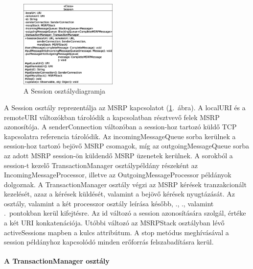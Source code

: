 \begin{figure}
  \vspace{-15pt}
  \begin{center}
    \includegraphics[width=0.43\textwidth]{img/class_diagrams/Session.eps}
  \end{center}
  \vspace{-15pt}
  \captionsetup{font=scriptsize}
  \caption{A Session osztálydiagramja}
   \label{fig:class_session}
  \vspace{-10pt}
\end{figure}
A Session osztály reprezentálja az MSRP kapcsolatot (\ref{fig:class_session}.~ábra). A localURI és a remoteURI változókban tárolódik a kapcsolatban résztvevő felek MSRP azonosítója. A senderConnection változóban a session-hoz tartozó küldő TCP kapcsolatra referencia tárolódik. Az incomingMessageQueue sorba kerülnek a session-hoz tartozó bejövő MSRP csomagok, míg az outgoingMessageQueue sorba az adott MSRP session-ön küldendő MSRP üzenetek kerülnek. A sorokból a session-t kezelő TransactionManager osztálypéldány részeként az IncomingMessageProcessor, illetve az OutgoingMessageProcessor példányok dolgoznak. A TransactionManager osztály végzi az MSRP kérések tranzakcionált kezelését, azaz a kérések küldését, valamint a bejövő kérések nyugtázását. Az osztály, valamint a két processzor osztály leírása később, ., ., valamint .~pontokban kerül kifejtésre. Az id változó a session azonosítására szolgál, értéke a két URI konkatenációja. Utóbbi változó az MSRPStack osztályban lévő activeSessions mapben a kulcs attribútum. A stop metódus meghívásával a session példányhoz kapcsolódó minden erőforrás felszabadításra kerül. 

\paragraph{A TransactionManager osztály\\}
\label{sec:msrp_transactionmanager}

